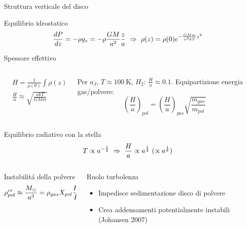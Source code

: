 \begin{frame}{Struttura verticale del disco}
\begin{block}{Equilibrio idrostatico}
\begin{equation*}
\TDy{z}{P}=-\rho g_z=-\rho\frac{GM}{a^2}\frac{z}{a}\ \Rightarrow\ \rho(z)=\rho(0)\exp{-\frac{GMm}{a^3kT}z^2}
\end{equation*}
\end{block}
\begin{block}{Spessore effettivo}
\begin{columns}[T]
\begin{column}{0.5\textwidth}
\begin{align*}
&H=\frac{1}{\rho(0)}\int\rho(z)\,dz\\
&\frac{H}{a}\approx\sqrt{\frac{akT}{GMm}}
\end{align*}
\end{column}
\begin{column}{0.5\textwidth}
Per $a_J$, $T\approx\SI{100}{\kelvin}$, $H_2$: $\frac{H}{a}\approx0.1$.
Equipartizione energia gas/polvere:
\begin{equation*}
(\frac{H}{a})_{pol}=(\frac{H}{a})_{gas}\sqrt{\frac{m_{gas}}{m_{pol}}}
\end{equation*}
\end{column}
\end{columns}
\end{block}
\begin{block}{Equilibrio radiativo con la stella}
\begin{equation*}
T\propto a\expy{-\frac{1}{2}}\ \Rightarrow\ \frac{H}{a}\propto a \expy{\frac{1}{4}}\ (\propto a \expy{\frac{1}{8}})
\end{equation*}
\end{block}
\begin{columns}[T]
\begin{column}{0.4\textwidth}
\begin{block}{Instabilit\'a della polvere}
\begin{equation*}
\rho_{pol}^{cr}\approx\frac{M_{\odot}{}}{a^3}=\rho_{gas}X_{pol}\frac{H_{gas}}{H_{pol}}
\end{equation*}
\end{block}
\end{column}
\begin{column}{0.6\textwidth}
\begin{block}{Ruolo turbolenza}
\begin{itemize}
\item Impedisce sedimentazione disco di polvere
\item Crea addensamenti potentialmente instabili (Johansen 2007)
\end{itemize}
\end{block}
\end{column}
\end{columns}
\end{frame}

